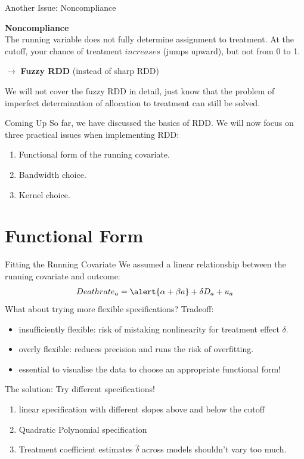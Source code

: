 \documentclass[11pt, aspectratio = 169]{beamer}
\begin{document}
			
\begin{frame}{Another Issue: Noncompliance}
				
				\textbf{Noncompliance} \\
				The running variable does not fully determine assignment to treatment. At the cutoff, your chance of treatment $increases$ (jumps upward), but not from 0 to 1.
				
				$\rightarrow$ \textbf{Fuzzy RDD} (instead of sharp RDD)
				
				We will not cover the fuzzy RDD in detail, just know that the problem of imperfect determination of allocation to treatment can still be solved.
\end{frame}

\begin{frame}{Coming Up}
				So far, we have discussed the basics of RDD. We will now focus on three practical issues when implementing RDD:
				\begin{enumerate}
					\item Functional form of the running covariate.
					\item Bandwidth choice.
					\item Kernel choice.
				\end{enumerate}
\end{frame}

\section{Functional Form}

\begin{frame}{Fitting the Running Covariate}
	We assumed a \alert{linear} relationship between the running covariate and outcome:
	\begin{align*}
			Deathrate_a = \alert{\alpha + \beta a} + \delta  D_a + u_a 
	\end{align*}
	\pause
	What about trying more flexible specifications? Tradeoff:
		\begin{itemize}
				\item insufficiently flexible: risk of mistaking nonlinearity for treatment effect $\delta$.
				\item overly flexible: reduces precision and runs the risk of overfitting.			
			\pause
				\item essential to visualise the data to choose an appropriate functional form!
		\end{itemize}
	\pause
	The solution: Try different specifications! 
		\begin{enumerate}
			\item linear specification with different slopes above and below the cutoff
			\item Quadratic Polynomial specification
			\item[$\rightarrow$] Treatment coefficient estimates $\hat{\delta}$ across models shouldn't vary too much.
		\end{enumerate}
	\end{frame}
	
\end{document}
